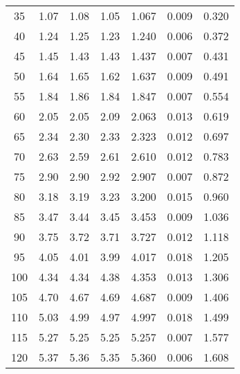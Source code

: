 \begin{table}[H]
{\begin{tabular}{
      S[table-format=3.0] 
      S[table-format=1.3] S[table-format=1.3] S[table-format=1.3]
      S[table-format=1.4] S[table-format=1.4] S[table-format=1.3]
      }
      35    & 1.07  & 1.08  & 1.05  & 1.067  & 0.009  & 0.320  \\
      40    & 1.24  & 1.25  & 1.23  & 1.240  & 0.006  & 0.372  \\
      45    & 1.45  & 1.43  & 1.43  & 1.437  & 0.007  & 0.431  \\
      50    & 1.64  & 1.65  & 1.62  & 1.637  & 0.009  & 0.491  \\
      55    & 1.84  & 1.86  & 1.84  & 1.847  & 0.007  & 0.554  \\
      60    & 2.05  & 2.05  & 2.09  & 2.063  & 0.013  & 0.619  \\
      65    & 2.34  & 2.30  & 2.33  & 2.323  & 0.012  & 0.697  \\
      70    & 2.63  & 2.59  & 2.61  & 2.610  & 0.012  & 0.783  \\
      75    & 2.90  & 2.90  & 2.92  & 2.907  & 0.007  & 0.872  \\
      80    & 3.18  & 3.19  & 3.23  & 3.200  & 0.015  & 0.960  \\
      85    & 3.47  & 3.44  & 3.45  & 3.453  & 0.009  & 1.036  \\
      90    & 3.75  & 3.72  & 3.71  & 3.727  & 0.012  & 1.118  \\
      95    & 4.05  & 4.01  & 3.99  & 4.017  & 0.018  & 1.205  \\
      100   & 4.34  & 4.34  & 4.38  & 4.353  & 0.013  & 1.306  \\
      105   & 4.70  & 4.67  & 4.69  & 4.687  & 0.009  & 1.406  \\
      110   & 5.03  & 4.99  & 4.97  & 4.997  & 0.018  & 1.499  \\
      115   & 5.27  & 5.25  & 5.25  & 5.257  & 0.007  & 1.577  \\
      120   & 5.37  & 5.36  & 5.35  & 5.360  & 0.006  & 1.608  \\
      \bottomrule 
    \end{tabular}
    }
\end{table}
%
